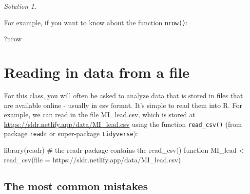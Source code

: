 \documentclass[
  letterpaper,
  DIV=11,
  numbers=noendperiod]{scrreprt}
\newenvironment{Shaded}{\begin{snugshade}}{\end{snugshade}}
\newcommand{\AttributeTok}[1]{\textcolor[rgb]{0.40,0.45,0.13}{#1}}
\newcommand{\CommentTok}[1]{\textcolor[rgb]{0.37,0.37,0.37}{#1}}
\newcommand{\FunctionTok}[1]{\textcolor[rgb]{0.28,0.35,0.67}{#1}}
\newcommand{\NormalTok}[1]{\textcolor[rgb]{0.00,0.23,0.31}{#1}}
\newcommand{\OtherTok}[1]{\textcolor[rgb]{0.00,0.23,0.31}{#1}}
\newcommand{\StringTok}[1]{\textcolor[rgb]{0.13,0.47,0.30}{#1}}
\theoremstyle{remark}
\newtheorem*{solution}{Solution}
\begin{document}
\begin{solution}
\leavevmode

\begin{tcolorbox}[enhanced jigsaw, colbacktitle=quarto-callout-note-color!10!white, opacitybacktitle=0.6, titlerule=0mm, left=2mm, leftrule=.75mm, toptitle=1mm, toprule=.15mm, rightrule=.15mm, title=\textcolor{quarto-callout-note-color}{\faInfo}\hspace{0.5em}{Solution}, colback=white, arc=.35mm, colframe=quarto-callout-note-color-frame, bottomrule=.15mm, breakable, bottomtitle=1mm, opacityback=0, coltitle=black]

For example, if you want to know about the function \texttt{nrow()}:

\begin{Shaded}
\begin{Highlighting}[]
\NormalTok{?nrow}
\end{Highlighting}
\end{Shaded}

\end{tcolorbox}

\end{solution}

\section{Reading in data from a file}\label{reading-in-data-from-a-file}

For this class, you will often be asked to analyze data that is stored
in files that are available online - usually in csv format. It's simple
to read them into R. For example, we can read in the file MI\_lead.csv,
which is stored at \url{https://sldr.netlify.app/data/MI_lead.csv} using
the function \texttt{read\_csv()} (from package \texttt{readr} or
super-package \texttt{tidyverse}):

\begin{Shaded}
\begin{Highlighting}[]
\FunctionTok{library}\NormalTok{(readr) }\CommentTok{\# the readr package contains the read\_csv() function}
\NormalTok{MI\_lead }\OtherTok{\textless{}{-}} \FunctionTok{read\_csv}\NormalTok{(}\AttributeTok{file =} \StringTok{\textquotesingle{}https://sldr.netlify.app/data/MI\_lead.csv\textquotesingle{}}\NormalTok{)}
\end{Highlighting}
\end{Shaded}

\subsection{The most common mistakes}\label{the-most-common-mistakes}
\end{document}
